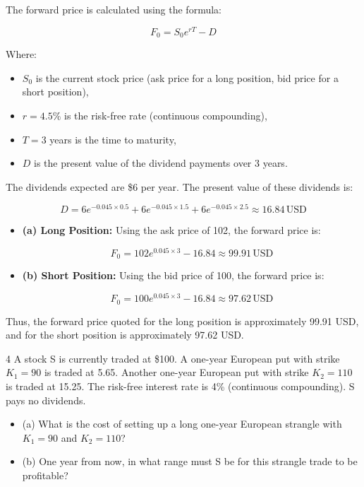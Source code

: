 \documentclass[12pt,letterpaper, onecolumn]{exam}
\begin{document}
\begin{solution}
The forward price is calculated using the formula:

\[
F_0 = S_0 e^{rT} - D
\]

Where:
\begin{itemize}
    \item \( S_0 \) is the current stock price (ask price for a long position, bid price for a short position),
    \item \( r = 4.5\% \) is the risk-free rate (continuous compounding),
    \item \( T = 3 \) years is the time to maturity,
    \item \( D \) is the present value of the dividend payments over 3 years.
\end{itemize}

The dividends expected are \$6 per year. The present value of these dividends is:

\[
D = 6 e^{-0.045 \times 0.5} + 6 e^{-0.045 \times 1.5} + 6 e^{-0.045 \times 2.5} \approx 16.84 \, \text{USD}
\]

\begin{itemize}
    \item \textbf{(a) Long Position:} Using the ask price of 102, the forward price is:

    \[
    F_0 = 102 e^{0.045 \times 3} - 16.84 \approx 99.91 \, \text{USD}
    \]

    \item \textbf{(b) Short Position:} Using the bid price of 100, the forward price is:

    \[
    F_0 = 100 e^{0.045 \times 3} - 16.84 \approx 97.62 \, \text{USD}
    \]
\end{itemize}

Thus, the forward price quoted for the long position is approximately 99.91 USD, and for the short position is approximately 97.62 USD.

\end{solution}

\newpage

\begin{question} 4
A stock S is currently traded at \$100. A one-year European put with strike \( K_1 = 90 \) is traded at 5.65. Another one-year European put with strike \( K_2 = 110 \) is traded at 15.25. The risk-free interest rate is 4\% (continuous compounding). S pays no dividends.

\begin{itemize}
    \item (a) What is the cost of setting up a long one-year European strangle with \( K_1 = 90 \) and \( K_2 = 110 \)?
    \item (b) One year from now, in what range must S be for this strangle trade to be profitable?
\end{itemize}
\end{question}
\end{document}

